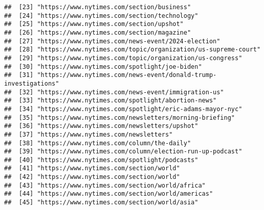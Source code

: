 \documentclass[
]{article}
\begin{document}
\begin{verbatim}
##  [23] "https://www.nytimes.com/section/business"                                                                  
##  [24] "https://www.nytimes.com/section/technology"                                                                
##  [25] "https://www.nytimes.com/section/upshot"                                                                    
##  [26] "https://www.nytimes.com/section/magazine"                                                                  
##  [27] "https://www.nytimes.com/news-event/2024-election"                                                          
##  [28] "https://www.nytimes.com/topic/organization/us-supreme-court"                                               
##  [29] "https://www.nytimes.com/topic/organization/us-congress"                                                    
##  [30] "https://www.nytimes.com/spotlight/joe-biden"                                                               
##  [31] "https://www.nytimes.com/news-event/donald-trump-investigations"                                            
##  [32] "https://www.nytimes.com/news-event/immigration-us"                                                         
##  [33] "https://www.nytimes.com/spotlight/abortion-news"                                                           
##  [34] "https://www.nytimes.com/spotlight/eric-adams-mayor-nyc"                                                    
##  [35] "https://www.nytimes.com/newsletters/morning-briefing"                                                      
##  [36] "https://www.nytimes.com/newsletters/upshot"                                                                
##  [37] "https://www.nytimes.com/newsletters"                                                                       
##  [38] "https://www.nytimes.com/column/the-daily"                                                                  
##  [39] "https://www.nytimes.com/column/election-run-up-podcast"                                                    
##  [40] "https://www.nytimes.com/spotlight/podcasts"                                                                
##  [41] "https://www.nytimes.com/section/world"                                                                     
##  [42] "https://www.nytimes.com/section/world"                                                                     
##  [43] "https://www.nytimes.com/section/world/africa"                                                              
##  [44] "https://www.nytimes.com/section/world/americas"                                                            
##  [45] "https://www.nytimes.com/section/world/asia"                                                                

\end{verbatim}
\end{document}
